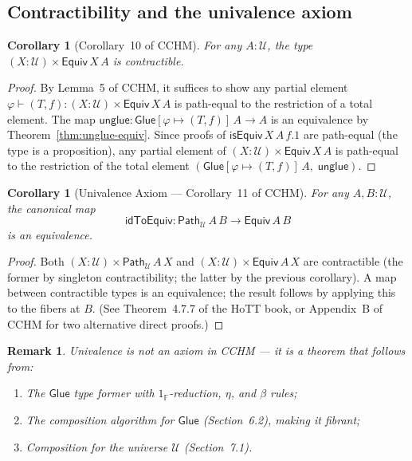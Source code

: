 \documentclass[11pt, a4paper]{article}
\newtheorem{corollary}[theorem]{Corollary}
\newtheorem{remark}[theorem]{Remark}
\newcommand{\UU}{\mathcal{U}}
\newcommand{\pt}[1]{\mathsf{#1}}
\newcommand{\GlueT}{\pt{Glue}}
\newcommand{\unglueT}{\pt{unglue}}
\newcommand{\EquivT}{\pt{Equiv}}
\newcommand{\isEquivT}{\pt{isEquiv}}
\newcommand{\PathT}{\pt{Path}}
\newcommand{\sys}[2]{[#1 \mapsto #2]}
\newcommand{\topF}{1_{\mathbb{F}}}
\begin{document}
\subsection{Contractibility and the univalence axiom}

\begin{corollary}[Corollary~10 of CCHM]
  For any $A : \UU$, the type $(X : \UU) \times \EquivT\, X\, A$ is
  contractible.
\end{corollary}

\begin{proof}
  By Lemma~5 of CCHM, it suffices to show any partial element
  $\varphi \vdash (T, f) : (X:\UU)\times\EquivT\,X\,A$ is path-equal to the
  restriction of a total element. The map
  $\unglueT : \GlueT\sys{\varphi}{(T,f)}\,A \to A$ is an equivalence by
  Theorem~\ref{thm:unglue-equiv}. Since proofs of $\isEquivT\,X\,A\,f.1$ are
  path-equal (the type is a proposition), any partial element of
  $(X:\UU)\times\EquivT\,X\,A$ is path-equal to the restriction of the total
  element $(\GlueT\sys{\varphi}{(T,f)}\,A,\; \unglueT)$.
\end{proof}

\begin{corollary}[Univalence Axiom — Corollary~11 of CCHM]
  For any $A, B : \UU$, the canonical map
  \[
    \pt{idToEquiv} : \PathT_\UU\, A\, B \to \EquivT\, A\, B
  \]
  is an equivalence.
\end{corollary}

\begin{proof}
  Both $(X : \UU) \times \PathT_\UU\, A\, X$ and $(X : \UU) \times
  \EquivT\, A\, X$ are contractible (the former by singleton contractibility;
  the latter by the previous corollary). A map between contractible types is
  an equivalence; the result follows by applying this to the fibers at $B$.
  (See Theorem~4.7.7 of the HoTT book, or Appendix~B of CCHM for two
  alternative direct proofs.)
\end{proof}

\begin{remark}
  Univalence is \emph{not} an axiom in CCHM — it is a \emph{theorem} that
  follows from:
  \begin{enumerate}
    \item The $\GlueT$ type former with $\topF$-reduction, $\eta$, and $\beta$
          rules;
    \item The composition algorithm for $\GlueT$ (Section~6.2), making it
          fibrant;
    \item Composition for the universe $\UU$ (Section~7.1).
  \end{enumerate}
\end{remark}
\end{document}
